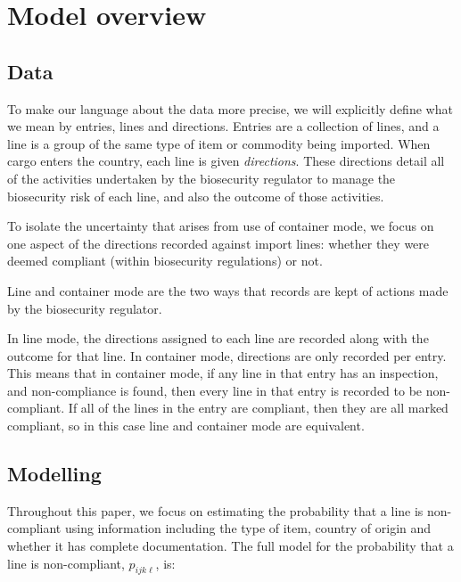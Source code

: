 \documentclass{article}
\newif\ifproofread
\newcommand{\rev}[1]{%
\ifproofread
\hl{#1}%
\else
#1%
\fi
}
\begin{document}
\section{Model overview}
\subsection{Data}\label{sec:data}

To make our language about the data more precise, we will explicitly define what we mean by entries, lines and directions. Entries are a collection of lines, and a line is a group of the same type of item or commodity being imported. When cargo enters the country, each line is given \emph{directions}. These directions detail all of the activities undertaken by the biosecurity regulator to manage the biosecurity risk of each line, and also the outcome of those activities. \rev{To isolate the uncertainty that arises from use of container mode, we focus on one aspect of the directions recorded against import lines: whether they were deemed compliant (within biosecurity regulations) or not.}

\rev{Line and container mode are the two ways that records are kept of actions made by the biosecurity regulator.} In line mode, the directions assigned to each line are recorded along with the outcome for that line. In container mode, directions are only recorded per entry. This means that in container mode, if any line in that entry has an inspection, and non-compliance is found, then every line in that entry is recorded to be non-compliant. If all of the lines in the entry are compliant, then they are all marked compliant, so in this case line and container mode are equivalent.

\subsection{Modelling}\label{sec:model}

Throughout this paper, we focus on estimating the probability that a line is non-compliant using information including the type of item, country of origin and whether it has complete documentation. The full model for the probability that a line is non-compliant, \(p_{ijk\ell}\), is: 
\end{document}
